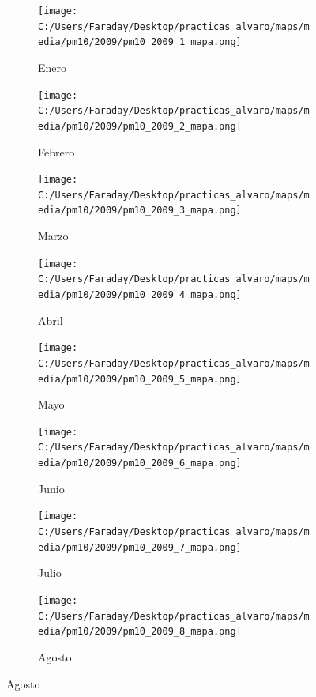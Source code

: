 \documentclass[12pt]{beamer}
\begin{document}
\begin{frame}[squeeze]
\tiny
\begin{figure}[H]
\centering
\begin{subfigure}[H]{0.20\textwidth}
\texttt{[image: C:/Users/Faraday/Desktop/practicas\_alvaro/maps/media/pm10/2009/pm10\_2009\_1\_mapa.png]}
\captionsetup{labelformat=empty}
\caption{\scriptsize Enero}
\label{fig:map-pm10-2009-1}
\end{subfigure}
%
\begin{subfigure}[H]{0.20\textwidth}
\texttt{[image: C:/Users/Faraday/Desktop/practicas\_alvaro/maps/media/pm10/2009/pm10\_2009\_2\_mapa.png]}
\captionsetup{labelformat=empty}
\caption{\scriptsize Febrero}
\label{fig:map-pm10-2009-2}
\end{subfigure}
%
\begin{subfigure}[H]{0.20\textwidth}
\texttt{[image: C:/Users/Faraday/Desktop/practicas\_alvaro/maps/media/pm10/2009/pm10\_2009\_3\_mapa.png]}
\captionsetup{labelformat=empty}
\caption{\scriptsize Marzo}
\label{fig:map-pm10-2009-3}
\end{subfigure}
%
\begin{subfigure}[H]{0.20\textwidth}
\texttt{[image: C:/Users/Faraday/Desktop/practicas\_alvaro/maps/media/pm10/2009/pm10\_2009\_4\_mapa.png]}
\captionsetup{labelformat=empty}
\caption{\scriptsize Abril}
\label{fig:map-pm10-2009-4}
\end{subfigure}

\begin{subfigure}[H]{0.20\textwidth}
\texttt{[image: C:/Users/Faraday/Desktop/practicas\_alvaro/maps/media/pm10/2009/pm10\_2009\_5\_mapa.png]}
\captionsetup{labelformat=empty}
\caption{\scriptsize Mayo}
\label{fig:map-pm10-2009-5}
\end{subfigure}
%
\begin{subfigure}[H]{0.20\textwidth}
\texttt{[image: C:/Users/Faraday/Desktop/practicas\_alvaro/maps/media/pm10/2009/pm10\_2009\_6\_mapa.png]}
\captionsetup{labelformat=empty}
\caption{\scriptsize Junio}
\label{fig:map-pm10-2009-6}
\end{subfigure}
%
\begin{subfigure}[H]{0.20\textwidth}
\texttt{[image: C:/Users/Faraday/Desktop/practicas\_alvaro/maps/media/pm10/2009/pm10\_2009\_7\_mapa.png]}
\captionsetup{labelformat=empty}
\caption{\scriptsize Julio}
\label{fig:map-pm10-2009-7}
\end{subfigure}
%
\begin{subfigure}[H]{0.20\textwidth}
\texttt{[image: C:/Users/Faraday/Desktop/practicas\_alvaro/maps/media/pm10/2009/pm10\_2009\_8\_mapa.png]}
\captionsetup{labelformat=empty}
\caption{\scriptsize Agosto}
\label{fig:map-pm10-2009-8}
\end{subfigure}


\end{figure}
\end{frame}
\end{document}

